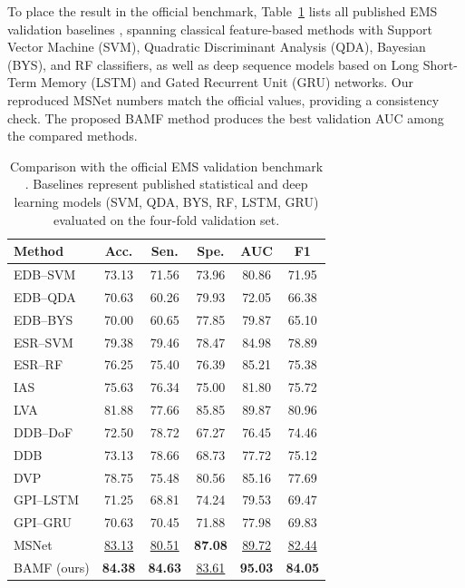 \documentclass[conference,a4paper]{IEEEtran}
\begin{document}
To place the result in the official benchmark, Table~\ref{tab:benchmark} lists all published EMS validation baselines \cite{song2024ems}, spanning classical feature-based methods with Support Vector Machine (SVM), Quadratic Discriminant Analysis (QDA), Bayesian (BYS), and RF classifiers, as well as deep sequence models based on Long Short-Term Memory (LSTM) and Gated Recurrent Unit (GRU) networks. Our reproduced MSNet numbers match the official values, providing a consistency check. The proposed BAMF method produces the best validation AUC among the compared methods. 

\begin{table}[t]
\caption{Comparison with the official EMS validation benchmark \cite{song2024ems}. Baselines represent published statistical and deep learning models (SVM, QDA, BYS, RF, LSTM, GRU) evaluated on the four-fold validation set.} 
\label{tab:benchmark}
\centering
\footnotesize
\setlength{\tabcolsep}{7.0pt}
\begin{tabular}{lccccc}
\toprule
Method & Acc. & Sen. & Spe. & AUC & F1 \\
\midrule
EDB--SVM & 73.13 & 71.56 & 73.96 & 80.86 & 71.95 \\
EDB--QDA & 70.63 & 60.26 & 79.93 & 72.05 & 66.38 \\
EDB--BYS & 70.00 & 60.65 & 77.85 & 79.87 & 65.10 \\
ESR--SVM & 79.38 & 79.46 & 78.47 & 84.98 & 78.89 \\
ESR--RF & 76.25 & 75.40 & 76.39 & 85.21 & 75.38 \\
IAS & 75.63 & 76.34 & 75.00 & 81.80 & 75.72 \\
LVA & 81.88 & 77.66 & 85.85 & 89.87 & 80.96 \\
DDB--DoF & 72.50 & 78.72 & 67.27 & 76.45 & 74.46 \\
DDB & 73.13 & 78.66 & 68.73 & 77.72 & 75.12 \\
DVP & 78.75 & 75.48 & 80.56 & 85.16 & 77.69 \\
GPI--LSTM & 71.25 & 68.81 & 74.24 & 79.53 & 69.47 \\
GPI--GRU & 70.63 & 70.45 & 71.88 & 77.98 & 69.83 \\
MSNet & \underline{83.13} & \underline{80.51} & \textbf{87.08} & \underline{89.72} & \underline{82.44} \\
\midrule
BAMF (ours) & \textbf{84.38} & \textbf{84.63} & \underline{83.61} & \textbf{95.03} & \textbf{84.05} \\
\bottomrule
\end{tabular}
\end{table}
\end{document}
